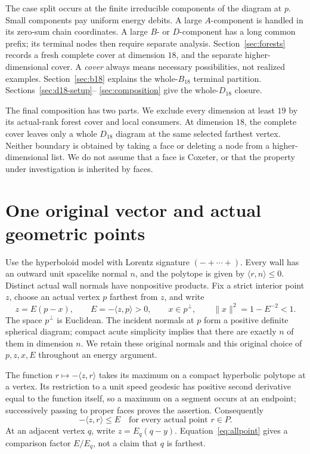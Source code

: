 \documentclass[11pt]{article}
\theoremstyle{definition}
\theoremstyle{remark}
\newcommand{\ip}[2]{\langle #1,#2\rangle}
\newcommand{\norm}[1]{\lVert #1\rVert}
\begin{document}
The case split occurs at the finite irreducible components of the
diagram at \(p\). Small components pay uniform energy debits.
A large \(A\)-component is handled in its zero-sum chain coordinates.
A large \(B\)- or \(D\)-component has a long common prefix; its terminal
nodes then require separate analysis. Section~\ref{sec:forests} records a
fresh complete cover at dimension \(18\), and the separate
higher-dimensional cover. A \emph{cover} always means necessary
possibilities, not realized examples. Section~\ref{sec:b18} explains the
whole-\(B_{18}\) terminal partition. Sections~\ref{sec:d18-setup}--%
\ref{sec:composition} give the whole-\(D_{18}\) closure.

The final composition has two parts. We exclude every dimension
at least \(19\) by its actual-rank forest cover and local consumers.
At dimension \(18\), the complete cover leaves only a whole
\(D_{18}\) diagram at the same selected farthest vertex. Neither boundary is obtained by taking a face
or deleting a node from a higher-dimensional list. We do not assume
that a face is Coxeter, or that the property under investigation is
inherited by faces.

\section{One original vector and actual geometric points}
\label{sec:geometry}
Use the hyperboloid model with Lorentz signature \((-+\cdots+)\).
Every wall has an outward unit spacelike normal \(n\), and the polytope
is given by \(\ip{r}{n}\leq0\). Distinct actual wall normals have
nonpositive products. Fix a strict interior point \(z\), choose an
actual vertex \(p\) farthest from \(z\), and write
\begin{equation}
\label{eq:original}
 z=E(p-x),\qquad E=-\ip{z}{p}>0,\qquad
 x\in p^\perp,\qquad \norm{x}^{2}=1-E^{-2}<1.
\end{equation}
The space \(p^\perp\) is Euclidean. The incident normals at \(p\) form
a positive definite spherical diagram; compact acute simplicity
implies that there are exactly \(n\) of them in dimension \(n\).
We retain these original normals and this original choice of
\(p,z,x,E\) throughout an energy argument.

The function \(r\mapsto-\ip{z}{r}\) takes its maximum on a compact
hyperbolic polytope at a vertex. Its restriction to a unit speed
geodesic has positive second derivative equal to the function itself,
so a maximum on a segment occurs at an endpoint; successively
passing to proper faces proves the assertion. Consequently
\begin{equation}
\label{eq:allpoint}
 -\ip{z}{r}\leq E\quad\text{for every actual point }r\in P.
\end{equation}
At an adjacent vertex \(q\), write \(z=E_q(q-y)\).
Equation~\eqref{eq:allpoint} gives a comparison factor \(E/E_q\),
not a claim that \(q\) is farthest.
\end{document}
